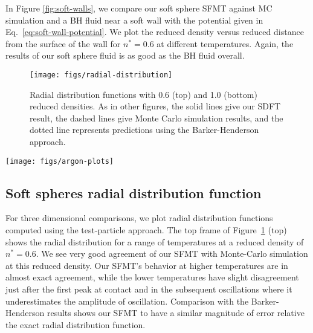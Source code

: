 \documentclass[letterpaper,twocolumn,amsmath,amssymb,prb]{revtex4-1}
\begin{document}
In Figure \ref{fig:soft-walls}, we compare our soft sphere SFMT
against MC simulation and a BH fluid near a soft wall
with the potential given in Eq.~\ref{eq:soft-wall-potential}. We
plot the reduced density versus reduced distance from the surface of
the wall for $n^*=0.6$ at different temperatures. Again, the results
of our soft sphere fluid is as good as the BH fluid
overall.

\begin{figure}
\begin{center}
  \texttt{[image: figs/radial-distribution]}
\end{center}
\caption{Radial distribution functions with 0.6 (top) and 1.0 (bottom)
  reduced densities. As in other figures, the solid lines give our
  SDFT result, the dashed lines give Monte Carlo simulation results,
  and the dotted line represents predictions using the
  Barker-Henderson approach.}
\label{fig:radial-distribution}
\end{figure}

\begin{figure*}
  \begin{center}
    \texttt{[image: figs/argon-plots]}
  \end{center}
  \caption{Radial distribution functions of Argon. From left to right
    the experimental data was taken at 85 K and vapor pressure, at 293
    K and 1.1 GPa, and at 148 K and 9.92 MPa.}
  \label{fig:argon-plots}
\end{figure*}

\subsection{Soft spheres radial distribution function}

For three dimensional comparisons, we plot radial distribution
functions computed using the test-particle approach.  
The top frame of Figure~\ref{fig:radial-distribution} (top) shows
the radial distribution for a range of temperatures at a reduced
density of $n^* = 0.6$. We see very good agreement of our SFMT with
Monte-Carlo simulation at this reduced density. Our SFMT's behavior at
higher temperatures are in almost exact agreement, while the lower
temperatures have slight disagreement just after the first peak at
contact and in the subsequent oscillations where it underestimates the
amplitude of oscillation. Comparison with the Barker-Henderson results
shows our SFMT to have a similar magnitude of error relative the exact
radial distribution function.
\end{document}

